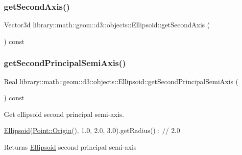 \subsubsection{\texorpdfstring{get\+Second\+Axis()}{getSecondAxis()}}
{\footnotesize\ttfamily Vector3d library\+::math\+::geom\+::d3\+::objects\+::\+Ellipsoid\+::get\+Second\+Axis (\begin{DoxyParamCaption}{ }\end{DoxyParamCaption}) const}

\mbox{\label{classlibrary_1_1math_1_1geom_1_1d3_1_1objects_1_1_ellipsoid_abdc2cc0bed7d473f0d4f572afd0de054}} 
\subsubsection{\texorpdfstring{get\+Second\+Principal\+Semi\+Axis()}{getSecondPrincipalSemiAxis()}}
{\footnotesize\ttfamily Real library\+::math\+::geom\+::d3\+::objects\+::\+Ellipsoid\+::get\+Second\+Principal\+Semi\+Axis (\begin{DoxyParamCaption}{ }\end{DoxyParamCaption}) const}



Get ellipsoid second principal semi-\/axis. 


\begin{DoxyCode}
\hyperlink{classlibrary_1_1math_1_1geom_1_1d3_1_1objects_1_1_ellipsoid_aae81fe0edc7f0e8d4590ea89ae73cb14}{Ellipsoid}(\hyperlink{classlibrary_1_1math_1_1geom_1_1d3_1_1objects_1_1_point_ab2a38e285c562e50bf350272c083986f}{Point::Origin}(), 1.0, 2.0, 3.0).getRadius() ; \textcolor{comment}{// 2.0}
\end{DoxyCode}


\begin{DoxyReturn}{Returns}
\hyperlink{classlibrary_1_1math_1_1geom_1_1d3_1_1objects_1_1_ellipsoid}{Ellipsoid} second principal semi-\/axis 
\end{DoxyReturn}
\mbox{\label{classlibrary_1_1math_1_1geom_1_1d3_1_1objects_1_1_ellipsoid_a12dc0fd72c672b3d78ec9a286db30c70}} 
